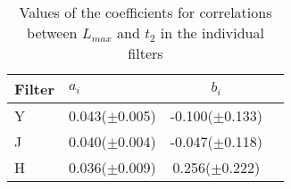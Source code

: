 \begin{table}
\caption{Values of the coefficients for correlations between $L_{max}$ and $t_2$ in the individual filters}
\begin{center}
\begin{tabular}{llcc}
\hline
Filter & $a_i $ & $b_i $	 \\
\hline
Y    &	0.043($\pm$0.005)  &	-0.100($\pm$0.133)	\\
J    & 	0.040($\pm$0.004)  &	-0.047($\pm$0.118)		\\
H    & 	0.036($\pm$0.009)  &	 0.256($\pm$0.222)		\\
\hline
\end{tabular}
\end{center}
\label{tab:coeff}
\end{table}
